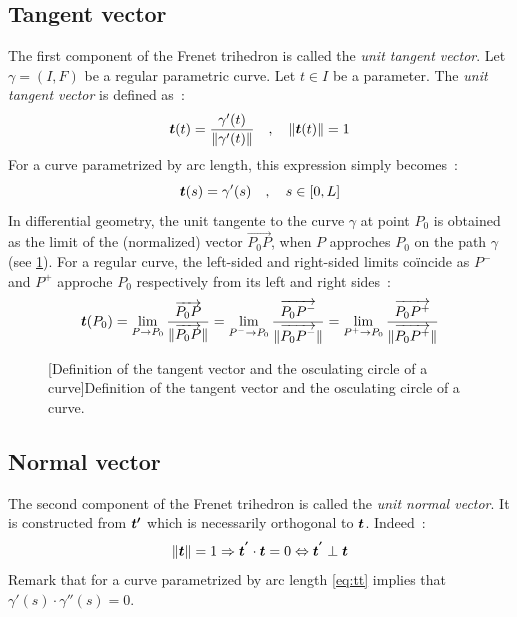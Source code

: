 \subsection{Tangent vector}
The first component of the Frenet trihedron is called the \emph{unit tangent vector}. 
Let $\gamma = (I,F)$ be a regular parametric curve. Let $t \in I$ be a parameter. The \emph{unit tangent vector} is defined as~:
\begin{equation}
	\boldsymbol{t}(t) = \frac{\gamma'(t)}{\lVert\gamma'(t)\rVert}
	\quad,\quad
	\lVert\boldsymbol{t}(t)\rVert=1
	\label{eq:def_tangent}
\end{equation}
For a curve parametrized by arc length, this expression simply becomes~:
\begin{equation}
	\boldsymbol{t}(s) = \gamma'(s)
	\quad,\quad
	s \in [0,L]
\end{equation}
In differential geometry, the unit tangente to the curve $\gamma$ at point $P_0$ is obtained as the limit of the (normalized) vector $\overrightarrow{P_0 P}$, when $P$ approches $P_0$ on the path $\gamma$ (see \cref{fig:3_1}). For a regular curve, the left-sided and right-sided limits coïncide as $P^-$ and $P^+$ approche $P_0$ respectively from its left and right sides~:
\begin{equation}
	\boldsymbol{t}(P_0)
	= \lim_{P \to P_0}\frac{\overrightarrow{P_0 P}}{\lVert\overrightarrow{P_0 P}\rVert}
	= \lim_{P^- \to P_0}\frac{\overrightarrow{P_0 P^-}}{\lVert\overrightarrow{P_0 P^-}\rVert}
	= \lim_{P^+ \to P_0}\frac{\overrightarrow{P_0 P^+}}{\lVert\overrightarrow{P_0 P^+}\rVert}
\label{eq:3_4}
\end{equation}

\begin{figure}[t]
     \centering
     [Definition of the tangent vector and the osculating circle of a curve]{Definition of the tangent vector and the osculating circle of a curve.}
     \label{fig:3_1}
\end{figure}

\subsection{Normal vector}
The second component of the Frenet trihedron is called the \emph{unit normal vector}. It is constructed from $\boldsymbol{t'}$ which is necessarily orthogonal to $\boldsymbol{t}$. Indeed~:
\begin{equation}
	\lVert\boldsymbol{t}\rVert=1 \Rightarrow \boldsymbol{t^{'}} \cdot  \boldsymbol{t} = 0 \Leftrightarrow  \boldsymbol{t^{'}} \perp \boldsymbol{t}
	\label{eq:tt}
\end{equation}
Remark that for a curve parametrized by arc length \cref{eq:tt} implies that $\gamma'(s) \cdot \gamma''(s) = 0$.

